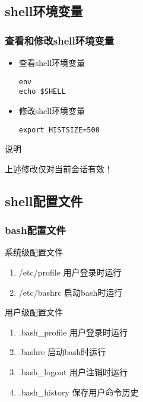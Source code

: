 \documentclass[xcolor=svgnames,presentation]{beamer}
\begin{document}
\subsection{shell环境变量}
\label{sec-4-1}
\begin{frame}[fragile]
\frametitle{查看和修改shell环境变量}
\label{sec-4-1-1}
\begin{itemize}

\item 查看shell环境变量\\
\label{sec-4-1-1-1}%
\begin{verbatim}
env
echo $SHELL
\end{verbatim}

\item 修改shell环境变量\\
\label{sec-4-1-1-2}%
\begin{verbatim}
export HISTSIZE=500
\end{verbatim}
\end{itemize} %
\begin{block}{说明}
\label{sec-4-1-1-3}

上述修改仅对当前会话有效！
\end{block}
\end{frame}
\subsection{shell配置文件}
\label{sec-4-2}
\begin{frame}
\frametitle{bash配置文件}
\label{sec-4-2-1}
\begin{exampleblock}{系统级配置文件}
\label{sec-4-2-1-1}

\begin{enumerate}
\item /etc/profile       用户登录时运行
\item /etc/bashrc        启动bash时运行
\end{enumerate}
\end{exampleblock}
\begin{block}{用户级配置文件}
\label{sec-4-2-1-2}

\begin{enumerate}
\item .bash\_profile     用户登录时运行
\item .bashrc            启动bash时运行
\item .bash\_logout      用户注销时运行
\item .bash\_history     保存用户命令历史
\end{enumerate}
\end{block}
\end{frame}
\end{document}
